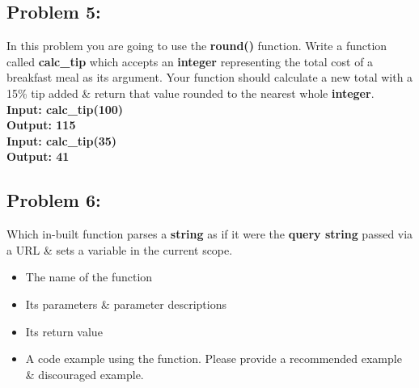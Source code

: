 \documentclass{article}
\begin{document}
\subsection*{Problem 5:}
In this problem you are going to use the \textbf{round()} function. Write a function called \textbf{calc\_tip} which accepts an \textbf{integer} representing the total cost of a breakfast meal as its argument. Your function should calculate a new total with a 15\% tip added \& return that value rounded to the nearest whole \textbf{integer}. \\

\textbf{Input: calc\_tip(100)} \\
\textbf{Output: 115} \\

\textbf{Input: calc\_tip(35)} \\
\textbf{Output: 41} 

\subsection*{Problem 6:}
Which in-built function parses a \textbf{string} as if it were the \textbf{query string} passed via a URL \& sets a variable in the current scope.

\begin{itemize}
    \item The name of the function
    \item Its parameters \& parameter descriptions
    \item Its return value
    \item A code example using the function. Please provide a recommended example \& discouraged example. 
\end{itemize}
\end{document}
